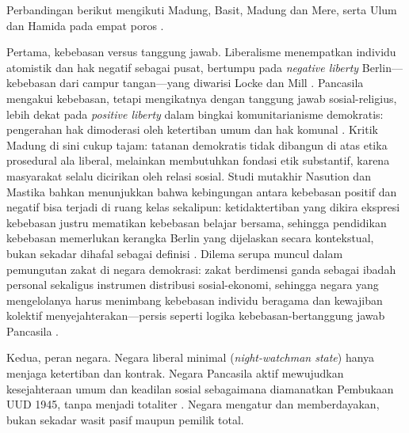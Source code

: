 \documentclass[journal]{IEEEtran}
\begin{document}
Perbandingan berikut mengikuti Madung, Basit, Madung dan Mere, serta Ulum dan Hamida pada empat poros \cite{madung2016,basit2023,madungmere2021,ulumhamida2018}.

Pertama, kebebasan versus tanggung jawab. Liberalisme menempatkan individu atomistik dan hak negatif sebagai pusat, bertumpu pada \textit{negative liberty} Berlin---kebebasan dari campur tangan---yang diwarisi Locke dan Mill \cite{berlin1969,locke1988,mill1978}. Pancasila mengakui kebebasan, tetapi mengikatnya dengan tanggung jawab sosial-religius, lebih dekat pada \textit{positive liberty} dalam bingkai komunitarianisme demokratis: pengerahan hak dimoderasi oleh ketertiban umum dan hak komunal \cite{madung2016}. Kritik Madung di sini cukup tajam: tatanan demokratis tidak dibangun di atas etika prosedural ala liberal, melainkan membutuhkan fondasi etik substantif, karena masyarakat selalu dicirikan oleh relasi sosial. Studi mutakhir Nasution dan Mastika bahkan menunjukkan bahwa kebingungan antara kebebasan positif dan negatif bisa terjadi di ruang kelas sekalipun: ketidaktertiban yang dikira ekspresi kebebasan justru mematikan kebebasan belajar bersama, sehingga pendidikan kebebasan memerlukan kerangka Berlin yang dijelaskan secara kontekstual, bukan sekadar dihafal sebagai definisi \cite{nasution2026,berlin1969}. Dilema serupa muncul dalam pemungutan zakat di negara demokrasi: zakat berdimensi ganda sebagai ibadah personal sekaligus instrumen distribusi sosial-ekonomi, sehingga negara yang mengelolanya harus menimbang kebebasan individu beragama dan kewajiban kolektif menyejahterakan---persis seperti logika kebebasan-bertanggung jawab Pancasila \cite{gumilanghudaefi}.

Kedua, peran negara. Negara liberal minimal (\textit{night-watchman state}) hanya menjaga ketertiban dan kontrak. Negara Pancasila aktif mewujudkan kesejahteraan umum dan keadilan sosial sebagaimana diamanatkan Pembukaan UUD 1945, tanpa menjadi totaliter \cite{uud1945,aswandi2019}. Negara mengatur dan memberdayakan, bukan sekadar wasit pasif maupun pemilik total.
\end{document}
